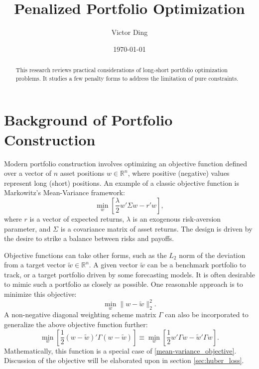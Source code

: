 \documentclass[11pt, letterpaper]{article}
\title{Penalized Portfolio Optimization}
\author{Victor Ding}
\affil{New Canaan High School}
\date{\today}
\begin{document}
\maketitle

\newpage
\setcounter{page}{1} %
\pagestyle{plain}

\begin{abstract}
\noindent
This research reviews practical considerations of long-short portfolio optimization problems. It studies a few penalty forms to
address the limitation of pure constraints.
\end{abstract}
\newpage
\section{Background of Portfolio Construction}

Modern portfolio construction involves optimizing an objective function defined over a vector of $n$ asset positions
$w \in \mathds{R}^n$, where positive (negative) values represent long (short) positions. An example of a classic objective
function is Markowitz's Mean-Variance framework:
\begin{equation}
    \label{mean-variance_objective}
    \underset{w}{\min} \left[\frac{\lambda}{2} w' \Sigma w - r' w\right],
\end{equation}
where $r$ is a vector of expected returns, $\lambda$ is an exogenous risk-aversion parameter, and $\Sigma$ is a covariance
matrix of asset returns. The design is driven by the desire to strike a balance between risks and payoffs.

Objective functions can take other forms, such as the $L_2$ norm of the deviation from a target vector $\tilde{w} \in
\mathds{R}^n$. A given vector $\tilde{w}$ can be a benchmark portfolio to track, or a target portfolio driven by some
forecasting models. It is often desirable to mimic such a portfolio as closely as possible. One reasonable approach is to
minimize this objective:
\begin{equation*}
	\underset{w}{\min} \lVert w - \tilde{w}\rVert_2^2.
\end{equation*}
A non-negative diagonal weighting scheme matrix $\Gamma$ can also be incorporated to generalize the above objective function further:
\begin{equation}
  \label{gamma_matrix}
	\underset{w}{\min}\left[\frac{1}{2} (w - \tilde{w})'\Gamma(w - \tilde{w})\right] \equiv
  \underset{w}{\min}\left[\frac{1}{2} w'\Gamma w - \tilde{w}'\Gamma w \right].
\end{equation}
Mathematically, this function is a special case of \eqref{mean-variance_objective}. Discussion of the objective will be elaborated upon in section
\ref{sec:huber_loss}.
\end{document}
